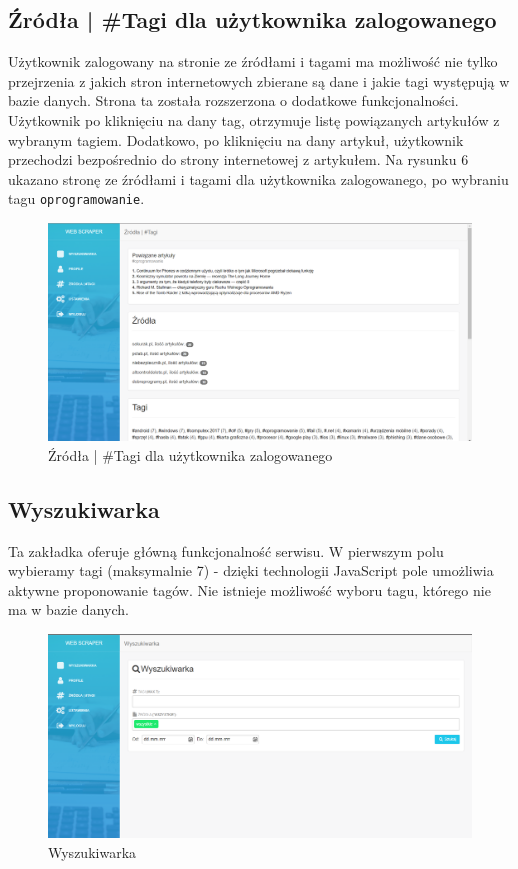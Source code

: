 \documentclass[12pt, titlepage]{article}
\begin{document}
	\subsection{Źródła | \#Tagi dla użytkownika zalogowanego}
	Użytkownik zalogowany na stronie ze źródłami i tagami ma możliwość nie tylko przejrzenia z jakich stron internetowych zbierane są dane i jakie tagi występują w bazie danych. Strona ta została rozszerzona o dodatkowe funkcjonalności. Użytkownik po kliknięciu na dany tag, otrzymuje listę powiązanych artykułów  z wybranym tagiem. Dodatkowo, po kliknięciu na dany artykuł, użytkownik przechodzi bezpośrednio do strony internetowej z artykułem. Na rysunku 6 ukazano stronę ze źródłami i tagami dla użytkownika zalogowanego, po wybraniu tagu \texttt{oprogramowanie}.
	\begin{figure}[H]
		\centering
		\includegraphics[scale=0.45]{obrazki/zalogowanyZrodla.png}
		\caption{Źródła | \#Tagi dla użytkownika zalogowanego}
		\label{fig:db_schema}
	\end{figure}
	
	\newpage
	\subsection{Wyszukiwarka}
	Ta zakładka oferuje główną funkcjonalność serwisu. W pierwszym polu wybieramy tagi (maksymalnie 7) - dzięki technologii JavaScript pole umożliwia aktywne proponowanie tagów.
	Nie istnieje możliwość wyboru tagu, którego nie ma w bazie danych.
	\begin{figure}[H]
	\centering
	\includegraphics[scale=0.45]{obrazki/wyszukiwarka.png}
	\caption{Wyszukiwarka}
	\label{fig:db_schema}
	\end{figure}
\end{document}
